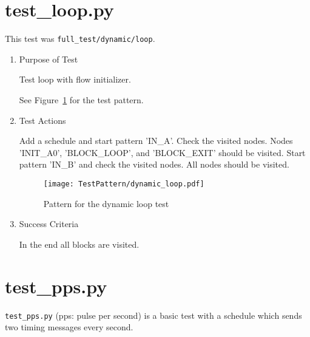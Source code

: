 \documentclass[12pt,a4paper]{report}
\begin{document}
\section{test\_loop.py}
This test was \texttt{full\_test/dynamic/loop}.
\begin{enumerate}
	\item Purpose of Test

        Test loop with flow initializer.

	See Figure~\ref{fig:Pattern_for_the_dynamic_loop_test} for the test pattern.
	\item Test Actions

        Add a schedule and start pattern 'IN\_A'. Check the visited nodes. Nodes 'INIT\_A0', 'BLOCK\_LOOP', and 'BLOCK\_EXIT'
        should be visited. Start pattern 'IN\_B' and check the visited nodes. All nodes should be visited.
    \begin{figure}
        \centering
        \texttt{[image: TestPattern/dynamic\_loop.pdf]}
        \caption{Pattern for the dynamic loop test}
        \label{fig:Pattern_for_the_dynamic_loop_test}
    \end{figure}
	\item Success Criteria

	In the end all blocks are visited.
\end{enumerate}
\section{test\_pps.py}
\texttt{test\_pps.py} (pps: pulse per second) is a basic test with a schedule which sends two timing messages every second.
\end{document}
